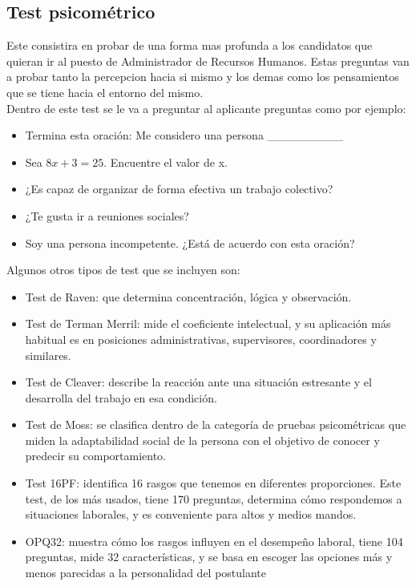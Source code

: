 \documentclass[letterpaper,12pt]{article}
\begin{document}
\begin{sloppypar}
\subsection{Test psicométrico}

Este consistira en probar de una forma mas profunda a los candidatos que quieran ir al puesto de Administrador de Recursos Humanos. Estas preguntas van a probar tanto la percepcion hacia si mismo y los demas como los pensamientos que se tiene hacia el entorno del mismo. 
\vspace{0.3cm}\\ 
\noindent Dentro de este test se le va a preguntar al aplicante preguntas como por ejemplo:

\begin{itemize}
    \item Termina esta oración: Me considero una persona \_\_\_\_\_\_\_\_\_
    \item Sea $8x + 3 = 25$. Encuentre el valor de x.  
    \item ¿Es capaz de organizar de forma efectiva un trabajo colectivo?
    \item ¿Te gusta ir a reuniones sociales?
    \item Soy una persona incompetente. ¿Está de acuerdo con esta oración?
\end{itemize}

Algunos otros tipos de test que se incluyen son: 
\begin{itemize}
    \item Test de Raven: que determina concentración, lógica y observación.
    \item Test de Terman Merril: mide el coeficiente intelectual, y su aplicación más habitual es en posiciones administrativas, supervisores, coordinadores y similares.
    \item Test de Cleaver: describe la reacción ante una situación estresante y el desarrolla del trabajo en esa condición. 
    \item Test de Moss: se clasifica dentro de la categoría de pruebas psicométricas que miden la adaptabilidad social de la persona con el objetivo de conocer y predecir su comportamiento.
    \item Test 16PF: identifica 16 rasgos que tenemos en diferentes proporciones. Este test, de los más usados, tiene 170 preguntas, determina cómo respondemos a situaciones laborales, y es conveniente para altos y medios mandos.
    \item OPQ32: muestra cómo los rasgos influyen en el desempeño laboral, tiene 104 preguntas, mide 32 características, y se basa en escoger las opciones más y menos parecidas a la personalidad del postulante
\end{itemize}


\end{sloppypar}
\end{document}
